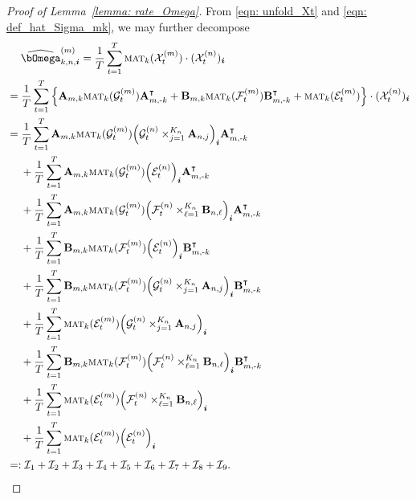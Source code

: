 \documentclass[aos]{imsart}
\theoremstyle{plain}
\theoremstyle{definition}
\def\mat{\textnormal{\textsc{mat}}}
\def\wh#1{\widehat{#1}}
\def\cE{\mathcal{E}}
\def\cF{\mathcal{F}}
\def\cG{\mathcal{G}} \def\cH{\boldsymbol{\mathcal{H}}} \def\cI{\mathcal{I}}
\def\cX{\mathcal{X}}
\def\bi{\boldsymbol{i}}
\def\bA{\mathbf{A}}
\def\bB{\mathbf{B}}
\def\trans{\intercal}
\begin{document}
\begin{proof}[Proof of Lemma~\ref{lemma: rate_Omega}]
From \eqref{eqn: unfold_Xt} and \eqref{eqn: def_hat_Sigma_mk}, we may further decompose
\begin{align}
    &\;\quad
    \wh\bOmega_{k,n,\bi}^{(m)} = \frac{1}{T} \sum_{t=1}^T \mat_k(\cX_t^{(m)}) \cdot (\cX_t^{(n)})_{\bi} \notag \\
    &=
    \frac{1}{T} \sum_{t=1}^T \Big\{ \bA_{m,k} \mat_k(\cG_t^{(m)}) \bA_{m,\text{-}k}^\trans + \bB_{m,k} \mat_k(\cF_t^{(m)}) \bB_{m,\text{-}k}^\trans + \mat_k(\cE_t^{(m)}) \Big\} \cdot (\cX_t^{(n)})_{\bi} \notag \\
    &=
    \frac{1}{T} \sum_{t=1}^T \bA_{m,k} \mat_k(\cG_t^{(m)}) \Big( \cG_t^{(n)} \times_{j=1}^{K_n} \bA_{n,j} \Big)_{\bi} \bA_{m,\text{-}k}^\trans \notag \\
    &\;\quad
    + \frac{1}{T} \sum_{t=1}^T \bA_{m,k} \mat_k(\cG_t^{(m)}) \Big( \cE_t^{(n)} \Big)_{\bi} \bA_{m,\text{-}k}^\trans \notag \\
    &\;\quad
    + \frac{1}{T} \sum_{t=1}^T \bA_{m,k} \mat_k(\cG_t^{(m)}) \Big( \cF_t^{(n)} \times_{\ell=1}^{K_n} \bB_{n,\ell} \Big)_{\bi} \bA_{m,\text{-}k}^\trans \notag \\
    &\;\quad
    + \frac{1}{T} \sum_{t=1}^T \bB_{m,k} \mat_k(\cF_t^{(m)}) \Big( \cE_t^{(n)} \Big)_{\bi} \bB_{m,\text{-}k}^\trans \notag \\
    &\;\quad
    + \frac{1}{T} \sum_{t=1}^T \bB_{m,k} \mat_k(\cF_t^{(m)}) \Big( \cG_t^{(n)} \times_{j=1}^{K_n} \bA_{n,j} \Big)_{\bi} \bB_{m,\text{-}k}^\trans \notag \\
    &\;\quad
    + \frac{1}{T} \sum_{t=1}^T \mat_k(\cE_t^{(m)}) \Big( \cG_t^{(n)} \times_{j=1}^{K_n} \bA_{n,j} \Big)_{\bi} \notag \\
    &\;\quad
    + \frac{1}{T} \sum_{t=1}^T \bB_{m,k} \mat_k(\cF_t^{(m)}) \Big( \cF_t^{(n)} \times_{\ell=1}^{K_n} \bB_{n,\ell} \Big)_{\bi} \bB_{m,\text{-}k}^\trans \notag \\
    &\;\quad
    + \frac{1}{T} \sum_{t=1}^T \mat_k(\cE_t^{(m)}) \Big( \cF_t^{(n)} \times_{\ell=1}^{K_n} \bB_{n,\ell} \Big)_{\bi} \notag \\
    &\;\quad
    + \frac{1}{T} \sum_{t=1}^T \mat_k(\cE_t^{(m)}) \Big( \cE_t^{(n)} \Big)_{\bi} \notag \\
    &
    =: \cI_1 + \cI_2 + \cI_3 + \cI_4 + \cI_5 + \cI_6 + \cI_7 + \cI_8 + \cI_9 .
    \label{eqn: decomp_Omega}
\end{align}



\end{proof}
\end{document}
